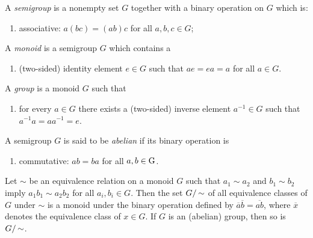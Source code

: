     \begin{definition}
        A \textit{semigroup} is a nonempty set $G$ together with a binary operation on $G$ which is:
            \begin{enumerate}[label = (\arabic*),itemsep=1pt,topsep=3pt]
                \item associative: $a(bc) = (ab)c$ for all $a,b,c \in G$;
            \end{enumerate}
        A \textit{monoid} is a semigroup $G$ which contains a 
            \begin{enumerate}[label = (\arabic*),itemsep=1pt,topsep=3pt]
                \addtocounter{enumi}{1}
                \item (two-sided) identity element $e \in G$ such that $ae = ea = a$ for all $ a\in G$.
            \end{enumerate}
        A \textit{group} is a monoid $G$ such that 
            \begin{enumerate}[label = (\arabic*),itemsep=1pt,topsep=3pt]
                \addtocounter{enumi}{2}
                \item for every $a \in G$ there exists a (two-sided) inverse element $a^{-1} \in G$ such that $a^{-1}a = a a^{-1} = e$.
            \end{enumerate}
        A semigroup $G$ is said to be \textit{abelian} if its binary operation is
            \begin{enumerate}[label = (\arabic*),itemsep=1pt,topsep=3pt]
                \addtocounter{enumi}{3}
                \item commutative: $ab = ba$ for all $a,b \in \operatorname{G}$.
            \end{enumerate}
    \end{definition}

    \begin{theorem}
        Let $\sim$ be an equivalence relation on a monoid $G$ such that $a_1 \sim a_2$ and $b_1 \sim b_2$ imply $a_1b_1 \sim a_2 b_2$ for all $a_i,b_i \in G$. Then the set $G/\hspace{-1pt}\sim$ of all equivalence classes of $G$ under $\sim$ is a monoid under the binary operation defined by $\overline{a} \overline{b} = \overline{ab}$, where $\overline{x}$ denotes the equivalence class of $x \in G$. If $G$ is an (abelian) group, then so is $G/\hspace{-1pt}\sim$.
    \end{theorem}

